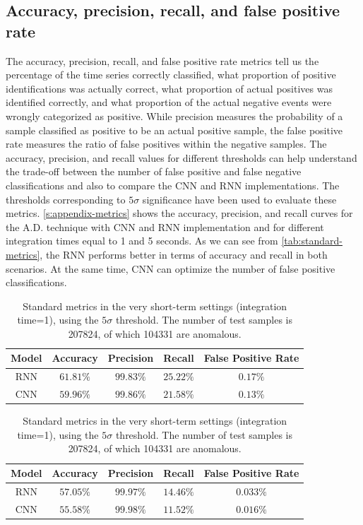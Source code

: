 \subsection{Accuracy, precision, recall, and false positive rate}
\label{s:Acc-Fpr}
The accuracy, precision, recall, and false positive rate metrics tell us the percentage of the time series correctly classified, what proportion of positive identifications was actually correct, what proportion of actual positives was identified correctly, and what proportion of the actual negative events were wrongly categorized as positive. While precision measures the probability of a sample classified as positive to be an actual positive sample, the false positive rate measures the ratio of false positives within the negative samples. The accuracy, precision, and recall values for different thresholds can help understand the trade-off between the number of false positive and false negative classifications and also to compare the CNN and RNN implementations. The thresholds corresponding to $5\sigma$ significance have been used to evaluate these metrics. \autoref{s:appendix-metrics} shows the accuracy, precision, and recall curves for the A.D. technique with CNN and RNN implementation and for different integration times equal to 1 and 5 seconds. As we can see from \autoref{tab:standard-metrics}, the RNN performs better in terms of accuracy and recall in both scenarios. At the same time, CNN can optimize the number of false positive classifications. 

\begin{table}[ht]
\centering
\begin{tabular}{|c|c|c|c|c|}
    \hline
    Model & Accuracy & Precision & Recall & False Positive Rate \\ 
    \hline
    RNN & $61.81\%$ & $99.83\%$ & $25.22\%$ & $0.17\%$ \\
    CNN & $59.96\%$ & $99.86\%$ & $21.58\%$ & $0.13\%$ \\
    \hline
    \end{tabular}
\caption{Standard metrics in the short-term settings (integration time=5), using the $5\sigma$ threshold. The number of test samples is 40224, of which 20531 are anomalous.}
\vspace{1cm}
\centering
\begin{tabular}{|c|c|c|c|c|}
    \hline
    Model & Accuracy & Precision & Recall & False Positive Rate \\ 
    \hline
    RNN & $57.05\%$ & $99.97\%$ & $14.46\%$ & $0.033\%$ \\
    CNN & $55.58\%$ & $99.98\%$ & $11.52\%$ & $0.016\%$ \\
    \hline
\end{tabular}
\caption{Standard metrics in the very short-term settings (integration time=1), using the $5\sigma$ threshold. The number of test samples is 207824, of which 104331 are anomalous.}
\label{tab:standard-metrics}
\end{table}

